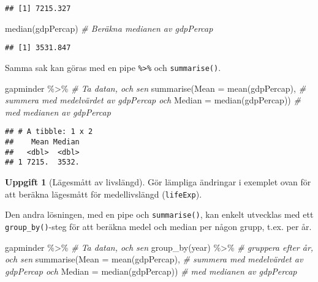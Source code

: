 \documentclass[
]{book}
\newenvironment{Shaded}{\begin{snugshade}}{\end{snugshade}}
\newcommand{\AttributeTok}[1]{\textcolor[rgb]{0.77,0.63,0.00}{#1}}
\newcommand{\CommentTok}[1]{\textcolor[rgb]{0.56,0.35,0.01}{\textit{#1}}}
\newcommand{\FunctionTok}[1]{\textcolor[rgb]{0.00,0.00,0.00}{#1}}
\newcommand{\NormalTok}[1]{#1}
\newcommand{\SpecialCharTok}[1]{\textcolor[rgb]{0.00,0.00,0.00}{#1}}
\theoremstyle{definition}
\theoremstyle{definition}
\theoremstyle{definition}
\newtheorem{exercise}{Uppgift}[chapter]
\theoremstyle{definition}
\theoremstyle{remark}
\begin{document}
\begin{verbatim}
## [1] 7215.327
\end{verbatim}

\begin{Shaded}
\begin{Highlighting}[]
\FunctionTok{median}\NormalTok{(gdpPercap)                      }\CommentTok{\# Beräkna medianen av gdpPercap}
\end{Highlighting}
\end{Shaded}

\begin{verbatim}
## [1] 3531.847
\end{verbatim}

Samma sak kan göras med en pipe \texttt{\%\textgreater{}\%} och \texttt{summarise()}.

\begin{Shaded}
\begin{Highlighting}[]
\NormalTok{gapminder }\SpecialCharTok{\%\textgreater{}\%}                                    \CommentTok{\# Ta datan, och sen}
  \FunctionTok{summarise}\NormalTok{(}\AttributeTok{Mean =} \FunctionTok{mean}\NormalTok{(gdpPercap),              }\CommentTok{\# summera med medelvärdet av gdpPercap och}
            \AttributeTok{Median =} \FunctionTok{median}\NormalTok{(gdpPercap))          }\CommentTok{\# med medianen av gdpPercap}
\end{Highlighting}
\end{Shaded}

\begin{verbatim}
## # A tibble: 1 x 2
##    Mean Median
##   <dbl>  <dbl>
## 1 7215.  3532.
\end{verbatim}

\begin{exercise}[Lägesmått av livslängd]
Gör lämpliga ändringar i exemplet ovan för att beräkna lägesmått för medellivslängd (\texttt{lifeExp}).
\end{exercise}

Den andra lösningen, med en pipe och \texttt{summarise()}, kan enkelt utvecklas med ett \texttt{group\_by()}-steg för att beräkna medel och median per någon grupp, t.ex. per år.

\begin{Shaded}
\begin{Highlighting}[]
\NormalTok{gapminder }\SpecialCharTok{\%\textgreater{}\%}                                    \CommentTok{\# Ta datan, och sen}
  \FunctionTok{group\_by}\NormalTok{(year) }\SpecialCharTok{\%\textgreater{}\%}                             \CommentTok{\# gruppera efter år, och sen}
  \FunctionTok{summarise}\NormalTok{(}\AttributeTok{Mean =} \FunctionTok{mean}\NormalTok{(gdpPercap),              }\CommentTok{\# summera med medelvärdet av gdpPercap och}
            \AttributeTok{Median =} \FunctionTok{median}\NormalTok{(gdpPercap))          }\CommentTok{\# med medianen av gdpPercap}
\end{Highlighting}
\end{Shaded}
\end{document}
